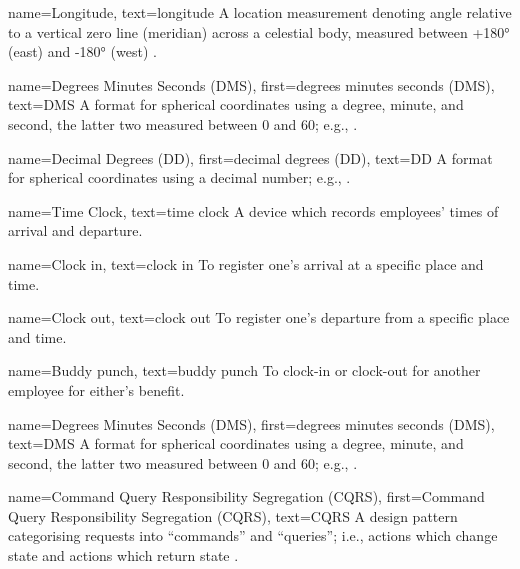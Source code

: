 {
  name={Longitude},
  text={longitude}
}
{
  A location measurement denoting angle relative to a
  vertical zero line (meridian) across a celestial body,
  measured between +\ang{180} (east) and -\ang{180} (west)
  \parencite{coordSystems}.
}

{
  name={Degrees Minutes Seconds (DMS)},
  first={degrees minutes seconds (DMS)},
  text={DMS}
}
{
  A format for spherical coordinates using a degree,
  minute,
  and second, the latter two measured between 0 and 60;
  e.g.,  \parencite{coordSystems}.
}

{
  name={Decimal Degrees (DD)},
  first={decimal degrees (DD)},
  text={DD}
}
{
  A format for spherical coordinates using a decimal
  number;
  e.g.,  \parencite{coordSystems}.
}

{
  name={Time Clock},
  text={time clock}
}
{
  A device which records employees' times of arrival and
  departure.
}

{
  name={Clock in},
  text={clock in}
}
{
  To register one's arrival at a specific place and time.
}

{
  name={Clock out},
  text={clock out}
}
{
  To register one's departure from a specific place and
  time.
}

{
  name={Buddy punch},
  text={buddy punch}
}
{
  To clock-in or clock-out for another employee for
  either's benefit.
}

{
  name={Degrees Minutes Seconds (DMS)},
  first={degrees minutes seconds (DMS)},
  text={DMS}
}
{
  A format for spherical coordinates using a degree,
  minute,
  and second, the latter two measured between 0 and 60;
  e.g.,  \parencite{coordSystems}.
}

{
  name={Command Query Responsibility Segregation (CQRS)},
  first={Command Query Responsibility Segregation (CQRS)},
  text={CQRS}
}
{
  A design pattern categorising requests into
  \enquote{commands} and \enquote{queries}; i.e.,  actions
  which change state and actions which return state
  \parencite{cqrs}.
}